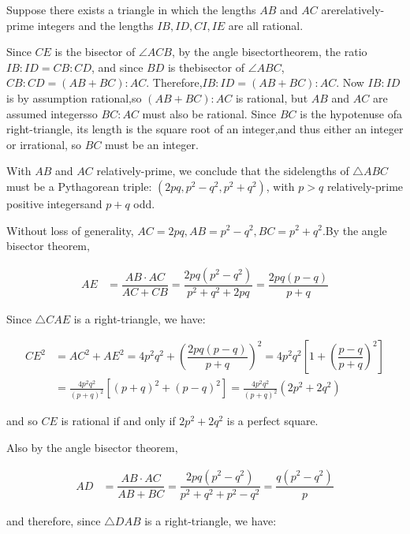 \begin{enumerate}
 Suppose there exists a triangle in which the lengths $AB$ and $AC$ arerelatively-prime integers and the lengths $IB, ID, CI, IE$ are all rational.

 Since $CE$ is the bisector of $\angle ACB$, by the angle bisectortheorem, the ratio $IB : ID = CB : CD$, and since $BD$ is thebisector of $\angle ABC$, $CB : CD = (AB + BC) : AC$. Therefore,$IB : ID = (AB + BC) : AC$. Now $IB : ID$ is by assumption rational,so $(AB + BC) : AC$ is rational, but $AB$ and $AC$ are assumed integersso $BC : AC$ must also be rational. Since $BC$ is the hypotenuse ofa right-triangle, its length is the square root of an integer,and thus either an integer or irrational, so $BC$ must be an integer.

 With $AB$ and $AC$ relatively-prime, we conclude that the sidelengths of $\triangle ABC$ must be a Pythagorean triple: $(2pq, p^2 - q^2, p^2 + q^2)$, with $p > q$ relatively-prime positive integersand $p+q$ odd.

 Without loss of generality, $AC = 2pq, AB = p^2 - q^2, BC = p^2+q^2$.By the angle bisector theorem,

 
 \begin{align*} AE &= \dfrac{AB \cdot AC}{AC + CB} = \dfrac{2pq(p^2-q^2)}{p^2 + q^2 + 2pq}    = \dfrac{2pq(p-q)}{p+q} \end{align*}


 

 Since $\triangle CAE$ is a right-triangle, we have:

 
 \begin{align*}   CE^2 &= AC^2 + AE^2        = 4p^2q^2 + \left(\dfrac{2pq(p-q)}{p+q}\right)^2        = 4p^2q^2\left[1 + \left(\dfrac{p-q}{p+q}\right)^2\right] \\        &= \frac{4p^2q^2}{(p+q)^2}\left[(p+q)^2 + (p-q)^2\right]        = \frac{4p^2q^2}{(p+q)^2}(2p^2 + 2q^2) \end{align*}


 

 and so $CE$ is rational if and only if $2p^2 + 2q^2$ is a perfect square.

 Also by the angle bisector theorem,

 
 \begin{align*} AD &= \dfrac{AB \cdot AC}{AB + BC} = \dfrac{2pq(p^2-q^2)}{p^2 + q^2 + p^2 - q^2}     = \dfrac{q(p^2-q^2)}{p} \end{align*}


 

 and therefore, since $\triangle DAB$ is a right-triangle, we have:


\end{enumerate}
